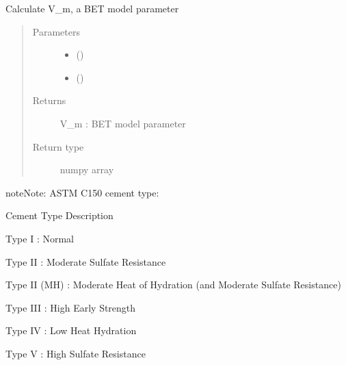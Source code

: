 \documentclass[letterpaper,10pt,english]{sphinxmanual}
\begin{document}

\begin{fulllineitems}
\label{\detokenize{corrosion:corrosion.V_m_f}}
\sphinxAtStartPar
Calculate V\_m, a BET model parameter
\begin{quote}\begin{description}
\item[{Parameters}] \leavevmode\begin{itemize}
\item {} 
\sphinxAtStartPar
{} (\sphinxstyleliteralemphasis{\sphinxupquote{ {[}}}\sphinxstyleliteralemphasis{\sphinxupquote{{]}}}) \textendash{} 

\item {} 
\sphinxAtStartPar
{} () \textendash{} 

\end{itemize}

\item[{Returns}] \leavevmode
\sphinxAtStartPar
V\_m : BET model parameter

\item[{Return type}] \leavevmode
\sphinxAtStartPar
numpy array

\end{description}\end{quote}

\begin{sphinxadmonition}{note}{Note:}
\sphinxAtStartPar
ASTM C150 cement type:

\sphinxAtStartPar
Cement Type          Description

\sphinxAtStartPar
Type I            :   Normal

\sphinxAtStartPar
Type II           :   Moderate Sulfate Resistance

\sphinxAtStartPar
Type II (MH)      :   Moderate Heat of Hydration (and Moderate Sulfate Resistance)

\sphinxAtStartPar
Type III          :   High Early Strength

\sphinxAtStartPar
Type IV           :   Low Heat Hydration

\sphinxAtStartPar
Type V            :   High Sulfate Resistance
\end{sphinxadmonition}

\end{fulllineitems}
\end{document}
